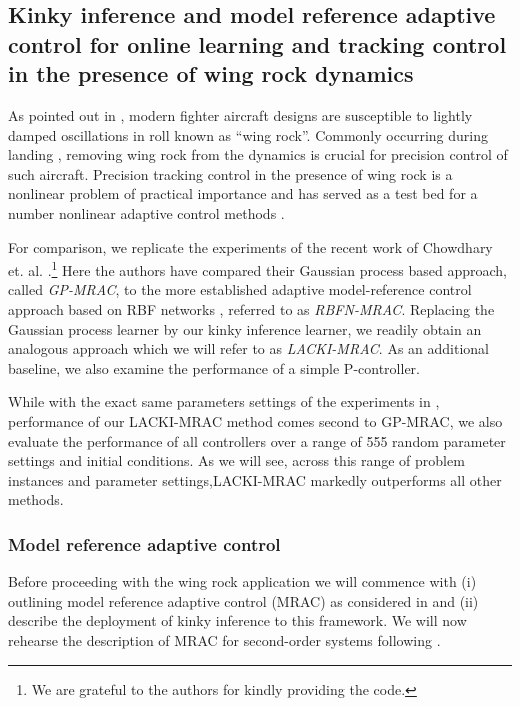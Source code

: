 \subsection{Kinky inference and model reference adaptive control for online learning and tracking control in the presence of wing rock dynamics }
\label{sec:KIMRAC}
As pointed out in \cite{chowdharyacc2013}, modern fighter aircraft designs are susceptible to lightly damped oscillations in roll known as ``wing rock''. Commonly occurring during landing \cite{Saad2000}, removing wing rock from the dynamics is crucial for precision control of such aircraft.
Precision tracking control in the presence of wing rock is a nonlinear problem of practical importance and has served as a test bed for a number nonlinear adaptive control methods \cite{Chowdhary2013,Monahemi1996,chowdharyacc2013}.

For comparison, we replicate the experiments of the recent work of Chowdhary et. al. \cite{Chowdhary2013,ChowdharyCDC2013}.\footnote{We are grateful to the authors for kindly providing the code.}
Here the authors have compared their Gaussian process based approach, called \textit{GP-MRAC}, to the more established adaptive model-reference control approach based on RBF networks \cite{Sanner1992,Kim1998}, referred to as \textit{RBFN-MRAC}. Replacing the Gaussian process learner by our kinky inference learner, we readily obtain an analogous approach which we will refer to as \textit{LACKI-MRAC}. As an additional baseline, we also examine the performance of a simple P-controller.

While with the exact same parameters settings of the experiments in \cite{Chowdhary2013}, performance of our LACKI-MRAC method comes second to GP-MRAC, we also evaluate the performance of all controllers over a range of 555 random parameter settings and initial conditions. As we will see, across this range of problem instances and parameter settings,LACKI-MRAC markedly outperforms all other methods.

\subsubsection{Model reference adaptive control}
Before proceeding with the wing rock application we will commence with (i) outlining model reference adaptive control (MRAC) \cite{astroemadaptivectrlbook2013} as considered in \cite{Chowdhary2013} and (ii) describe the deployment of kinky inference to this framework. 
We will now rehearse the description of MRAC for second-order systems following \cite{Chowdhary2013}. 

